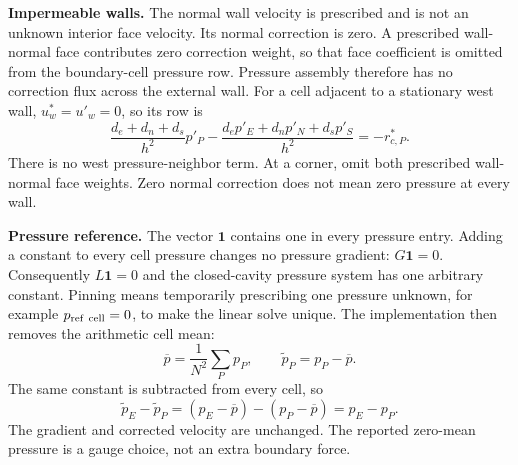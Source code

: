 \newpage
{}
\textbf{Impermeable walls.} The normal wall velocity is prescribed and is not an unknown interior face velocity. Its normal correction is zero. A prescribed wall-normal face contributes zero correction weight, so that face coefficient is omitted from the boundary-cell pressure row. Pressure assembly therefore has no correction flux across the external wall. For a cell adjacent to a stationary west wall, $u_w^*=u'_w=0$, so its row is
\[
\frac{d_e+d_n+d_s}{h^2}p'_P
-\frac{d_ep'_E+d_np'_N+d_sp'_S}{h^2}=-r_{c,P}^*.
\]
There is no west pressure-neighbor term. At a corner, omit both prescribed wall-normal face weights. Zero normal correction does not mean zero pressure at every wall.

\textbf{Pressure reference.} The vector $\boldsymbol 1$ contains one in every pressure entry. Adding a constant to every cell pressure changes no pressure gradient: $G\boldsymbol 1=0$. Consequently $L\boldsymbol 1=0$ and the closed-cavity pressure system has one arbitrary constant. Pinning means temporarily prescribing one pressure unknown, for example $p_{\rm ref\ cell}=0$, to make the linear solve unique. The implementation then removes the arithmetic cell mean:
\[
\overline p=\frac{1}{N^2}\sum_Pp_P,\qquad
\widetilde p_P=p_P-\overline p.
\]
The same constant is subtracted from every cell, so
\[
\widetilde p_E-\widetilde p_P=(p_E-\overline p)-(p_P-\overline p)=p_E-p_P.
\]
The gradient and corrected velocity are unchanged. The reported zero-mean pressure is a gauge choice, not an extra boundary force.

